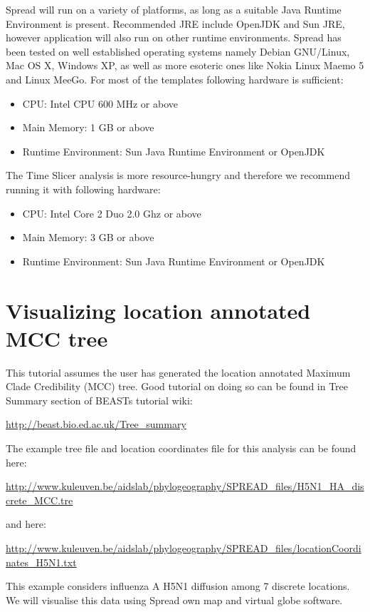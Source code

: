 Spread will run on a variety of platforms, as long as a suitable Java
Runtime Environment is present. Recommended JRE include OpenJDK and
Sun JRE, however application will also run on other runtime environments.
Spread has been tested on well established operating systems namely
Debian GNU/Linux, Mac OS X, Windows XP, as well as more esoteric ones
like Nokia Linux Maemo 5 and Linux MeeGo. For most of the templates
following hardware is sufficient: 

\begin{itemize}
\item CPU: Intel CPU 600 MHz or above
\item Main Memory: 1 GB or above
\item Runtime Environment: Sun Java Runtime Environment or OpenJDK 
\end{itemize}
The Time Slicer analysis is more resource-hungry and therefore we
recommend running it with following hardware:
\begin{itemize}
\item CPU: Intel Core 2 Duo 2.0 Ghz or above
\item Main Memory: 3 GB or above
\item Runtime Environment: Sun Java Runtime Environment or OpenJDK 
\end{itemize}

\section{Visualizing location annotated MCC tree}

This tutorial assumes the user has generated the location annotated
Maximum Clade Credibility (MCC) tree. 
Good tutorial on doing so can be found in Tree Summary section of BEASTs tutorial wiki: 

\url{http://beast.bio.ed.ac.uk/Tree_summary} 

\noindent
The example tree file and location coordinates file for this analysis can be found here:

\url{http://www.kuleuven.be/aidslab/phylogeography/SPREAD_files/H5N1_HA_discrete_MCC.tre}

\noindent
and here: 

\url{http://www.kuleuven.be/aidslab/phylogeography/SPREAD_files/locationCoordinates_H5N1.txt}

\noindent
This example considers influenza A H5N1 diffusion among 7 discrete locations. 
We will visualise this data using Spread own map and virtual globe software. 


